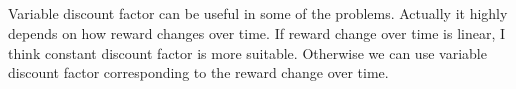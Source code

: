 \documentclass[en]{university}
\begin{document}
\subsection{}
Variable discount factor can be useful in some of the problems.
Actually it highly depends on how reward changes over time.
If reward change over time is linear, I think constant discount factor is more suitable.
Otherwise we can use variable discount factor corresponding to the reward change over time.

\section{}
\subsection{}

\subsection{}

\subsection{}
\end{document}

